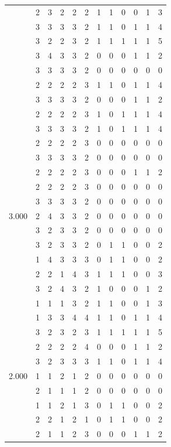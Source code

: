 \documentclass[]{msu-thesis}
\theoremstyle{definition}
\theoremstyle{definition}
\theoremstyle{definition}
\theoremstyle{remark}
\begin{document}
\begin{table}
{\begin{tabular}[t]{rrrrrrrrrrrr}
 & 2 & 3 & 2 & 2 & 2 & 1 & 1 & 0 & 0 & 1 & 3\\
 & 3 & 3 & 3 & 3 & 2 & 1 & 1 & 0 & 1 & 1 & 4\\
 & 3 & 2 & 2 & 3 & 2 & 1 & 1 & 1 & 1 & 1 & 5\\
 & 3 & 4 & 3 & 3 & 2 & 0 & 0 & 0 & 1 & 1 & 2\\
 & 3 & 3 & 3 & 3 & 2 & 0 & 0 & 0 & 0 & 0 & 0\\
 & 2 & 2 & 2 & 2 & 3 & 1 & 1 & 0 & 1 & 1 & 4\\
 & 3 & 3 & 3 & 3 & 2 & 0 & 0 & 0 & 1 & 1 & 2\\
 & 2 & 2 & 2 & 2 & 3 & 1 & 0 & 1 & 1 & 1 & 4\\
 & 3 & 3 & 3 & 3 & 2 & 1 & 0 & 1 & 1 & 1 & 4\\
 & 2 & 2 & 2 & 2 & 3 & 0 & 0 & 0 & 0 & 0 & 0\\
 & 3 & 3 & 3 & 3 & 2 & 0 & 0 & 0 & 0 & 0 & 0\\
 & 2 & 2 & 2 & 2 & 3 & 0 & 0 & 0 & 1 & 1 & 2\\
 & 2 & 2 & 2 & 2 & 3 & 0 & 0 & 0 & 0 & 0 & 0\\
 & 3 & 3 & 3 & 3 & 2 & 0 & 0 & 0 & 0 & 0 & 0\\
3.000 & 2 & 4 & 3 & 3 & 2 & 0 & 0 & 0 & 0 & 0 & 0\\
 & 3 & 2 & 3 & 3 & 2 & 0 & 0 & 0 & 0 & 0 & 0\\
 & 3 & 2 & 3 & 3 & 2 & 0 & 1 & 1 & 0 & 0 & 2\\
 & 1 & 4 & 3 & 3 & 3 & 0 & 1 & 1 & 0 & 0 & 2\\
 & 2 & 2 & 1 & 4 & 3 & 1 & 1 & 1 & 0 & 0 & 3\\
 & 3 & 2 & 4 & 3 & 2 & 1 & 0 & 0 & 0 & 1 & 2\\
 & 1 & 1 & 1 & 3 & 2 & 1 & 1 & 0 & 0 & 1 & 3\\
 & 1 & 3 & 3 & 4 & 4 & 1 & 1 & 0 & 1 & 1 & 4\\
 & 3 & 2 & 3 & 2 & 3 & 1 & 1 & 1 & 1 & 1 & 5\\
 & 2 & 2 & 2 & 2 & 4 & 0 & 0 & 0 & 1 & 1 & 2\\
 & 3 & 2 & 3 & 3 & 3 & 1 & 1 & 0 & 1 & 1 & 4\\
2.000 & 1 & 1 & 2 & 1 & 2 & 0 & 0 & 0 & 0 & 0 & 0\\
 & 2 & 1 & 1 & 1 & 2 & 0 & 0 & 0 & 0 & 0 & 0\\
 & 1 & 1 & 2 & 1 & 3 & 0 & 1 & 1 & 0 & 0 & 2\\
 & 2 & 2 & 1 & 2 & 1 & 0 & 1 & 1 & 0 & 0 & 2\\
 & 2 & 1 & 1 & 2 & 3 & 0 & 0 & 0 & 1 & 1 & 2\\

\end{tabular}}
\end{table}
\end{document}
